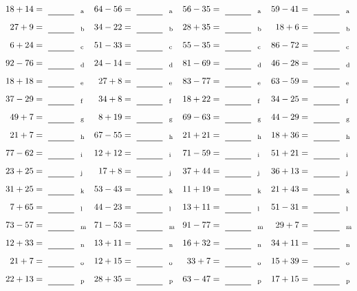 \documentclass
[
  draft    = true,
  fontsize = 11pt,
  parskip  = half-
]
{scrartcl}
\begin{document}
\clearpage
\begin{align*}
    \pline{18+14}&=\rline{a}
  & \pline{64-56}&=\rline{a}
  & \pline{56-35}&=\rline{a}
  & \pline{59-41}&=\rline{a} \\[1ex]
    \pline{27+9}&=\rline{b}
  & \pline{34-22}&=\rline{b}
  & \pline{28+35}&=\rline{b}
  & \pline{18+6}&=\rline{b} \\[1ex]
    \pline{6+24}&=\rline{c}
  & \pline{51-33}&=\rline{c}
  & \pline{55-35}&=\rline{c}
  & \pline{86-72}&=\rline{c} \\[1ex]
    \pline{92-76}&=\rline{d}
  & \pline{24-14}&=\rline{d}
  & \pline{81-69}&=\rline{d}
  & \pline{46-28}&=\rline{d} \\[1ex]
    \pline{18+18}&=\rline{e}
  & \pline{27+8}&=\rline{e}
  & \pline{83-77}&=\rline{e}
  & \pline{63-59}&=\rline{e} \\[1ex]
    \pline{37-29}&=\rline{f}
  & \pline{34+8}&=\rline{f}
  & \pline{18+22}&=\rline{f}
  & \pline{34-25}&=\rline{f} \\[1ex]
    \pline{49+7}&=\rline{g}
  & \pline{8+19}&=\rline{g}
  & \pline{69-63}&=\rline{g}
  & \pline{44-29}&=\rline{g} \\[1ex]
    \pline{21+7}&=\rline{h}
  & \pline{67-55}&=\rline{h}
  & \pline{21+21}&=\rline{h}
  & \pline{18+36}&=\rline{h} \\[1ex]
    \pline{77-62}&=\rline{i}
  & \pline{12+12}&=\rline{i}
  & \pline{71-59}&=\rline{i}
  & \pline{51+21}&=\rline{i} \\[1ex]
    \pline{23+25}&=\rline{j}
  & \pline{17+8}&=\rline{j}
  & \pline{37+44}&=\rline{j}
  & \pline{36+13}&=\rline{j} \\[1ex]
    \pline{31+25}&=\rline{k}
  & \pline{53-43}&=\rline{k}
  & \pline{11+19}&=\rline{k}
  & \pline{21+43}&=\rline{k} \\[1ex]
    \pline{7+65}&=\rline{l}
  & \pline{44-23}&=\rline{l}
  & \pline{13+11}&=\rline{l}
  & \pline{51-31}&=\rline{l} \\[1ex]
    \pline{73-57}&=\rline{m}
  & \pline{71-53}&=\rline{m}
  & \pline{91-77}&=\rline{m}
  & \pline{29+7}&=\rline{m} \\[1ex]
    \pline{12+33}&=\rline{n}
  & \pline{13+11}&=\rline{n}
  & \pline{16+32}&=\rline{n}
  & \pline{34+11}&=\rline{n} \\[1ex]
    \pline{21+7}&=\rline{o}
  & \pline{12+15}&=\rline{o}
  & \pline{33+7}&=\rline{o}
  & \pline{15+39}&=\rline{o} \\[1ex]
    \pline{22+13}&=\rline{p}
  & \pline{28+35}&=\rline{p}
  & \pline{63-47}&=\rline{p}
  & \pline{17+15}&=\rline{p}
\end{align*}
\end{document}
